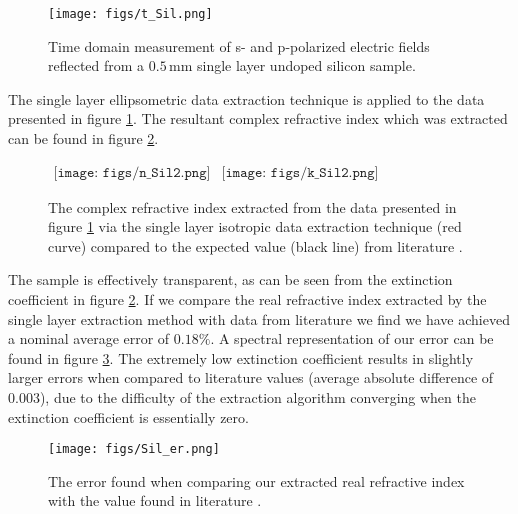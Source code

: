 \begin{figure}[H]
\begin{center}
\texttt{[image: figs/t\_Sil.png]}
\end{center}
\caption[Time-domain measurement: Single layer undoped silicon, focused on pulse and internal reflections]{\label{fig:SiliconSingleE0t} Time domain measurement of s- and p-polarized electric fields reflected from a $0.5\,$mm single layer undoped silicon sample.}
\end{figure}

The single layer ellipsometric data extraction technique is applied to the data presented in figure \ref{fig:SiliconSingleE0t}. The resultant complex refractive index which was extracted can be found in figure \ref{fig:SingleSilExt}.

\begin{figure}[H]
                \begin{center}$
								\begin{array}{cc}
                \texttt{[image: figs/n\_Sil2.png]}&
                \texttt{[image: figs/k\_Sil2.png]}
								\end{array}$
								\end{center}
	\caption[Extract complex refractive index of single layer undoped silicon sample]{The complex refractive index extracted from the data presented in figure \ref{fig:SiliconSingleE0t} via the single layer isotropic data extraction technique (red curve) compared to the expected value (black line) from literature \cite{Li-2008,Jepsen-2007,Grischkowsky1990}.}
	\label{fig:SingleSilExt}
\end{figure}

The sample is effectively transparent, as can be seen from the extinction coefficient in figure \ref{fig:SingleSilExt}. If we compare the real refractive index extracted by the single layer extraction method with data from literature \cite{Li-2008,Jepsen-2007,Grischkowsky1990} we find we have achieved a nominal average error of $0.18\%$. A spectral representation of our error can be found in figure \ref{fig:SiliconErr}. The extremely low extinction coefficient results in slightly larger errors when compared to literature values (average absolute difference of $0.003$), due to the difficulty of the extraction algorithm converging when the extinction coefficient is essentially zero.

\begin{figure}[H]
\begin{center}
\texttt{[image: figs/Sil\_er.png]}
\end{center}
\caption[Error in data extracted for undoped silicon]{\label{fig:SiliconErr} The error found when comparing our extracted real refractive index with the value found in literature \cite{Li-2008,Jepsen-2007,Grischkowsky1990}.}
\end{figure}

